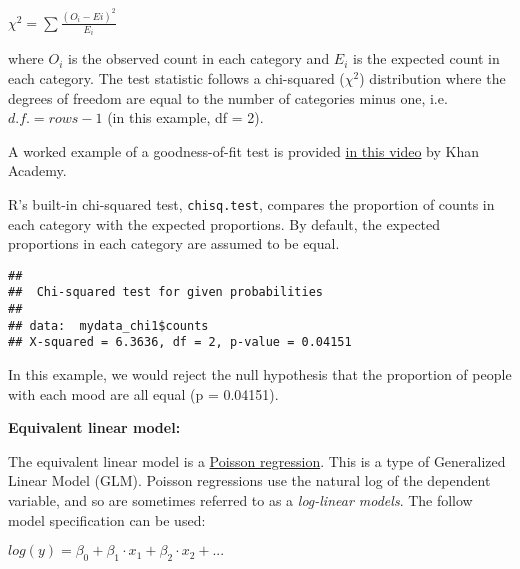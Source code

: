 \documentclass[
  12pt,
]{krantz}
\newenvironment{Shaded}{\begin{snugshade}}{\end{snugshade}}
\newcommand{\CommentTok}[1]{\textcolor[rgb]{0.56,0.35,0.01}{\textit{#1}}}
\newcommand{\KeywordTok}[1]{\textcolor[rgb]{0.13,0.29,0.53}{\textbf{#1}}}
\newcommand{\NormalTok}[1]{#1}
\newcommand{\OperatorTok}[1]{\textcolor[rgb]{0.81,0.36,0.00}{\textbf{#1}}}
\begin{document}
\begin{center}

\(\chi^2 = \sum \frac{(O_i - Ei)^2}{E_i}\)

\end{center}

where \(O_i\) is the observed count in each category and \(E_i\) is the expected count in each category.
The test statistic follows a chi-squared (\(\chi^2\)) distribution where the degrees of freedom are equal to the number of categories minus one, i.e.~\(d.f. = rows - 1\) (in this example, df = 2).

A worked example of a goodness-of-fit test is provided \href{https://www.khanacademy.org/math/statistics-probability/inference-categorical-data-chi-square-tests/chi-square-goodness-of-fit-tests/v/chi-square-statistic}{in this video} by Khan Academy.

R's built-in chi-squared test, \texttt{chisq.test}, compares the proportion of counts in each category with the expected proportions. By default, the expected proportions in each category are assumed to be equal.

\begin{Shaded}
\end{Shaded}

\begin{verbatim}
## 
##  Chi-squared test for given probabilities
## 
## data:  mydata_chi1$counts
## X-squared = 6.3636, df = 2, p-value = 0.04151
\end{verbatim}

In this example, we would reject the null hypothesis that the proportion of people with each mood are all equal (p = 0.04151).

\textbf{Equivalent linear model:}

The equivalent linear model is a \href{https://en.wikipedia.org/wiki/Poisson_regression}{Poisson regression}. This is a type of Generalized Linear Model (GLM). Poisson regressions use the natural log of the dependent variable, and so are sometimes referred to as a \emph{log-linear models}. The follow model specification can be used:

\begin{center}

\(log(y) = \beta_0 + \beta_1 \cdot x_1 + \beta_2 \cdot x_2 + ...\)

\end{center}
\end{document}
